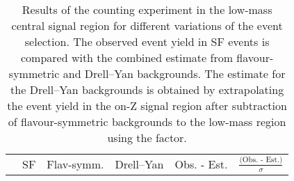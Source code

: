 
\begin{table}[hbtp]
 \renewcommand{\arraystretch}{1.3}
 \setlength{\belowcaptionskip}{6pt}
 \centering
 \caption{Results of the counting experiment in the low-mass central signal region for different variations of the event selection. The observed event yield in SF events is compared with the combined estimate from flavour-symmetric and Drell--Yan backgrounds. The estimate for the Drell--Yan backgrounds is obtained by extrapolating the event yield in the on-Z signal region after subtraction of flavour-symmetric backgrounds to the low-mass region using the \Routin factor.}
  \label{tab:CountingCrosschecks}
  \begin{tabular}{l|c|c|c|c|c}
                                &  SF        & Flav-symm.  &  Drell--Yan  & Obs. - Est. & $\frac{\text{(Obs. - Est.)}}{ \sigma}$\\ 


\end{tabular}
\end{table}
